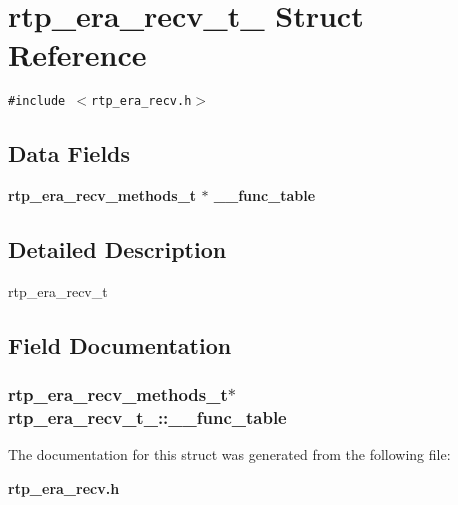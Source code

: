 \section{rtp\_\-era\_\-recv\_\-t\_\- Struct Reference}
\label{structrtp__era__recv__t__}
{\tt \#include $<$rtp\_\-era\_\-recv.h$>$}

\subsection*{Data Fields}
\begin{CompactItemize}
\item 
\bf{rtp\_\-era\_\-recv\_\-methods\_\-t} $\ast$ \bf{\_\-\_\-func\_\-table}
\end{CompactItemize}


\subsection{Detailed Description}
rtp\_\-era\_\-recv\_\-t 



\subsection{Field Documentation}
\subsubsection{\setlength{\rightskip}{0pt plus 5cm}\bf{rtp\_\-era\_\-recv\_\-methods\_\-t}$\ast$ \bf{rtp\_\-era\_\-recv\_\-t\_\-::\_\-\_\-func\_\-table}}\label{structrtp__era__recv__t___33459209b7204518ed0e7f749475fd4c}




The documentation for this struct was generated from the following file:\begin{CompactItemize}
\item 
\bf{rtp\_\-era\_\-recv.h}\end{CompactItemize}
